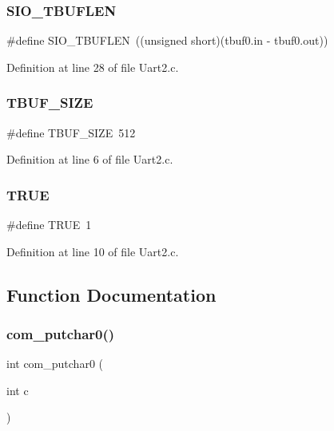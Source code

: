 \mbox{\label{_uart2_8c_a7db38b364db60a522523264cf855b80f}} 
\subsubsection{S\+I\+O\+\_\+\+T\+B\+U\+F\+L\+EN}
{\footnotesize\ttfamily \#define S\+I\+O\+\_\+\+T\+B\+U\+F\+L\+EN~((unsigned short)(tbuf0.\+in -\/ tbuf0.\+out))}



Definition at line 28 of file Uart2.\+c.

\mbox{\label{_uart2_8c_a892610d54eb362bcd3ac6c92812a860e}} 
\subsubsection{T\+B\+U\+F\+\_\+\+S\+I\+ZE}
{\footnotesize\ttfamily \#define T\+B\+U\+F\+\_\+\+S\+I\+ZE~512}



Definition at line 6 of file Uart2.\+c.

\mbox{\label{_uart2_8c_aa8cecfc5c5c054d2875c03e77b7be15d}} 
\subsubsection{T\+R\+UE}
{\footnotesize\ttfamily \#define T\+R\+UE~1}



Definition at line 10 of file Uart2.\+c.



\subsection{Function Documentation}
\mbox{\label{_uart2_8c_a15e3dee4d22b4cff2dd1b5d0d6254404}} 
\subsubsection{com\+\_\+putchar0()}
{\footnotesize\ttfamily int com\+\_\+putchar0 (\begin{DoxyParamCaption}\item[{int}]{c }\end{DoxyParamCaption})}



